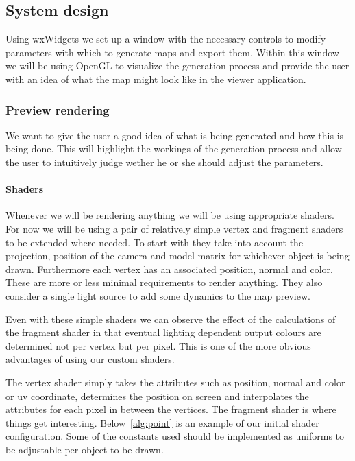 \subsection{System design}

Using wxWidgets we set up a window with the necessary controls to modify parameters with which to generate maps and export them. Within this window we will be using OpenGL to visualize the generation process and provide the user with an idea of what the map might look like in the viewer application.

\subsubsection{Preview rendering}

We want to give the user a good idea of what is being generated and how this is being done. This will highlight the workings of the generation process and allow the user to intuitively judge wether he or she should adjust the parameters.

\paragraph{Shaders}

Whenever we will be rendering anything we will be using appropriate shaders. For now we will be using a pair of relatively simple vertex and fragment shaders to be extended where needed. To start with they take into account the projection, position of the camera and model matrix for whichever object is being drawn. Furthermore each vertex has an associated position, normal and color. These are more or less minimal requirements to render anything. They also consider a single light source to add some dynamics to the map preview. 

Even with these simple shaders we can observe the effect of the calculations of the fragment shader in that eventual lighting dependent output colours are determined not per vertex but per pixel. This is one of the more obvious advantages of using our custom shaders.

The vertex shader simply takes the attributes such as position, normal and color or uv coordinate, determines the position on screen and interpolates the attributes for each pixel in between the vertices. The fragment shader is where things get interesting. Below~\ref{alg:point} is an example of our initial shader configuration. Some of the constants used should be implemented as uniforms to be adjustable per object to be drawn.
 
